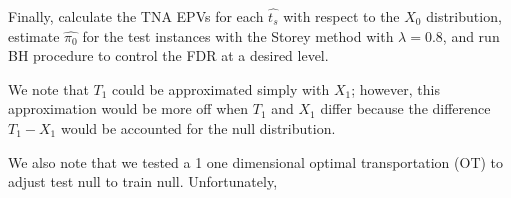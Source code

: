 \documentclass{article}
\begin{document}
	Finally, calculate the TNA EPVs for each $\hat{t_s}$ with respect to the $X_0$ distribution, estimate  $\hat{\pi_0}$ for the test instances with the Storey method with $\lambda= 0.8$, and run BH procedure to control the FDR at a desired level. 
	
	We note that $T_1$ could be approximated simply with $X_1$; however, this approximation would be more off when $T_1$ and $X_1$ differ because the difference $T_1-X_1$ would be accounted for the null distribution.
	
	We also note that we tested a 1 one dimensional optimal transportation (OT) to adjust test null to train null. Unfortunately, 
	
	
	
%	
%	
	
%	
%	
%	
%	
\end{document}
